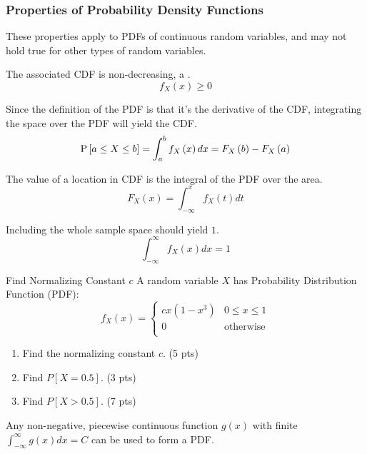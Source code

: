 		\subsubsection{Properties of Probability Density Functions} \label{subsubsec:Properties of Probability Density Functions}
			These properties apply to PDFs of continuous random variables, and may not hold true for other types of random variables.
			\begin{propertylist}
				\item The associated CDF is non-decreasing, a .
					\begin{equation}
						f_{X} \left( x \right) \geq 0
					\end{equation}
				\item Since the definition of the PDF is that it's the derivative of the CDF, integrating the space over the PDF will yield the CDF.
					\begin{equation}
						\operatorname{\operatorname{P}} \left[ a \leq X \leq b \right] = \int_{a}^{b} f_{X} \left( x \right) dx = F_{X} \left( b \right) - F_{X} \left( a \right)
					\end{equation}
				\item The value of a location in CDF is the integral of the PDF over the area.
					\begin{equation}
						F_{X} \left( x \right) = \int_{-\infty}^{x} f_{X} \left( t \right) dt
					\end{equation}
				\item Including the whole sample space should yield $1$.
					\begin{equation}
						\int_{-\infty}^{\infty} f_{X} \left( x \right) dx = 1
					\end{equation}
			\end{propertylist}
					\begin{example}{Find Normalizing Constant $c$}
						A random variable $X$ has Probability Distribution Function (PDF):
						\begin{equation*}
							f_{X}\left( x \right) = \begin{cases}
								cx \left( 1- x^{3} \right) & 0 \leq x \leq 1 \\
								0 & \text{otherwise} \\
								\end{cases}
							\end{equation*}
						\begin{enumerate}
							\item Find the normalizing constant $c$. (5 pts)
							\item Find $P \left[ X = 0.5 \right]$. (3 pts)
							\item Find $P \left[ X > 0.5 \right]$. (7 pts)
						\end{enumerate}
					\end{example}
			\begin{remark*}
				Any non-negative, piecewise continuous function $g \left( x \right)$ with finite $\int_{-\infty}^{\infty} g \left( x \right) dx = C$ can be used to form a PDF.
			\end{remark*}
		
